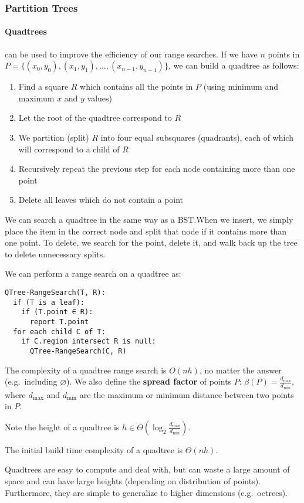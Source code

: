 \documentclass[12pt]{article}
\begin{document}
\subsubsection{Partition Trees}
\paragraph{Quadtrees} can be used to improve the efficiency of our range searches. If we have $n$ points in $P = \{(x_0,y_0), (x_1,y_1), \dots, (x_{n-1},y_{n-1})\}$, we can build a quadtree as follows:
\begin{enumerate}
\item Find a square $R$ which contains all the points in $P$ (using minimum and maximum $x$ and $y$ values)
\item Let the root of the quadtree correspond to $R$
\item We partition (split) $R$ into four equal subsquares (quadrants), each of which will correspond to a child of $R$
\item Recursively repeat the previous step for each node containing more than one point
\item Delete all leaves which do not contain a point
\end{enumerate}

We can search a quadtree in the same way as a BST.\@ When we insert, we simply place the item in the correct node and split that node if it contains more than one point. To delete, we search for the point, delete it, and walk back up the tree to delete unnecessary splits.

We can perform a range search on a quadtree as:
\begin{verbatim}
QTree-RangeSearch(T, R):
  if (T is a leaf):
    if (T.point ∈ R):
      report T.point
  for each child C of T:
    if C.region intersect R is null:
      QTree-RangeSearch(C, R)
\end{verbatim}

The complexity of a quadtree range search is $O(nh)$, no matter the answer (e.g.\ including $\varnothing$). We also define the {\bf spread factor} of points $P$: $\beta(P) = \frac{d_{\max}}{d_{\min}}$, where $d_{\max}$ and $d_{\min}$ are the maximum or minimum distance between two points in $P$.

Note the height of a quadtree is $h \in \Theta(\log_2 \frac{d_{\max}}{d_{\min}})$.

The initial build time complexity of a quadtree is $\Theta(nh)$.

Quadtrees are easy to compute and deal with, but can waste a large amount of space and can have large heights (depending on distribution of points). Furthermore, they are simple to generalize to higher dimensions (e.g.\ octrees).
\end{document}
